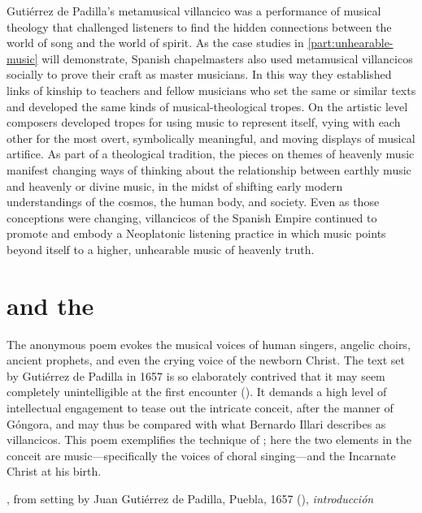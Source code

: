 Gutiérrez de Padilla's metamusical villancico was a performance of musical
theology that challenged listeners to find the hidden connections between the
world of song and the world of spirit.
As the case studies in \cref{part:unhearable-music} will demonstrate, Spanish
chapelmasters also used metamusical villancicos socially to prove their craft
as master musicians.
In this way they established links of kinship to teachers and fellow musicians
who set the same or similar texts and developed the same kinds of
musical-theological tropes.
On the artistic level composers developed tropes for using music to represent
itself, vying with each other for the most overt, symbolically meaningful, and
moving displays of musical artifice.
As part of a theological tradition, the pieces on themes of heavenly music
manifest changing ways of thinking about the relationship between earthly music
and heavenly or divine music, in the midst of shifting early modern
understandings of the cosmos, the human body, and society.
Even as those conceptions were changing, villancicos of the Spanish Empire
continued to promote and embody a Neoplatonic listening practice in which music
points beyond itself to a higher, unhearable music of heavenly truth.

\section{ and the }

The anonymous poem evokes the musical voices of human singers, angelic choirs,
ancient prophets, and even the crying voice of the newborn Christ.
The text set by Gutiérrez de Padilla in 1657 is so elaborately contrived that
it may seem completely unintelligible at the first encounter
().%
    \Autocites
    [37--38, 119--132]{Cashner:WLSCM32}
    [133--203]{Cashner:PhD}
It demands a high level of intellectual engagement to tease out the intricate
conceit, after the manner of Góngora, and may thus be compared with what
Bernardo Illari describes as  villancicos.%
    \Autocite[vol. 2, 304--308]{Illari:Polychoral}
This poem exemplifies the technique of ; here the two
elements in the conceit are music---specifically the voices of choral
singing---and the Incarnate Christ at his birth.

{, from setting by Juan Gutiérrez
de Padilla, Puebla, 1657 (), \emph{introducción}}

